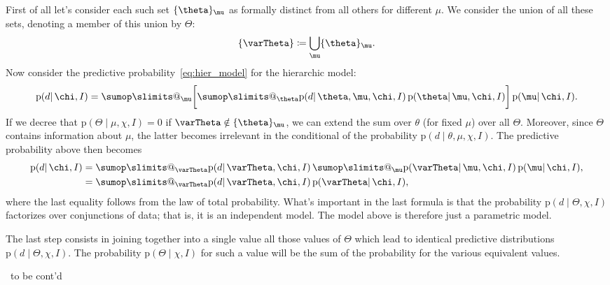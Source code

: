 \documentclass[\ifafour a4paper,12pt,\else a5paper,10pt,\fi%
onecolumn,oneside,article,%
british%
]{memoir}
\makeatletter
\theoremstyle{remark}
\theoremstyle{innote}
\def\sum{\DOTSI\sumop\slimits@}
\newcommand*{\defd}{\coloneqq}
\DeclarePairedDelimiter\set{\{}{\}}
\newcommand*{\pf}{\mathrm{p}}%
\renewcommand*{\|}{\mathpunct{|}}
\newcommand*{\puzzle}{\maltese}
\newcommand{\mynote}[1]{ {\color{notecolour}\puzzle\ #1\ }}
\newcommand*{\yth}{\theta}
\newcommand*{\yTh}{\varTheta}
\newcommand*{\ymu}{\mu}
\newcommand*{\yh}{\chi}
\newcommand*{\yI}{I}
\makeatother
\begin{document}
First of all let's consider each such set $\set{\yth}_{\ymu}$ as formally
distinct from all others for different $\ymu$. We consider the union of all
these sets, denoting a member of this union by $\yTh$:
\begin{equation}
  \label{eq:union_indip_models}
  \set{\yTh} \defd \bigcup_{\ymu}\set{\yth}_{\ymu}.
\end{equation}
Now consider the predictive probability~\eqref{eq:hier_model} for the
hierarchic model:
\begin{equation}
  \label{eq:hier_model_simple}
  \pf(d \| \yh, \yI) =
\sum_\ymu\biggl[ \sum_{\yth}
\pf(d \|\yth,\ymu,\yh,\yI)\,
     \pf(\yth \| \ymu,\yh, \yI)\biggr]\,
     \pf(\ymu \| \yh,\yI).
\end{equation}
If we decree that $\pf(\yTh \| \ymu,\yh,\yI) = 0$ if $\yTh \notin
\set{\yth}_{\ymu}$, we can extend the sum over $\yth$ (for fixed $\ymu$)
over all $\yTh$. Moreover, since $\yTh$ contains information about $\ymu$,
the latter becomes irrelevant in the conditional of the probability $\pf(d
\|\yth,\ymu,\yh,\yI)$. The predictive probability above then becomes
\begin{equation}
  \label{eq:hier_model_Theta}
  \begin{split}
  \pf(d \| \yh, \yI) &=
\sum_{\yTh}
\pf(d \|\yTh,\yh,\yI)\, \sum_\ymu 
     \pf(\yTh \| \ymu,\yh, \yI)\,
     \pf(\ymu \| \yh,\yI),
\\ &= \sum_{\yTh}
\pf(d \|\yTh,\yh,\yI)\,
     \pf(\yTh \| \yh, \yI),
   \end{split}
\end{equation}
where the last equality follows from the law of total probability. What's
important in the last formula is that the probability
$\pf(d \|\yTh,\yh,\yI)$ factorizes over conjunctions of data; that is, it
is an independent model. The model above is therefore just a parametric
model.

The last step consists in joining together into a single value all those
values of $\yTh$ which lead to identical predictive distributions
$\pf(d \|\yTh,\yh,\yI)$. The probability $\pf(\yTh \| \yh, \yI)$  for such
a value will be the sum of the probability for the various equivalent values.

\mynote{to be cont'd}



\end{document}
